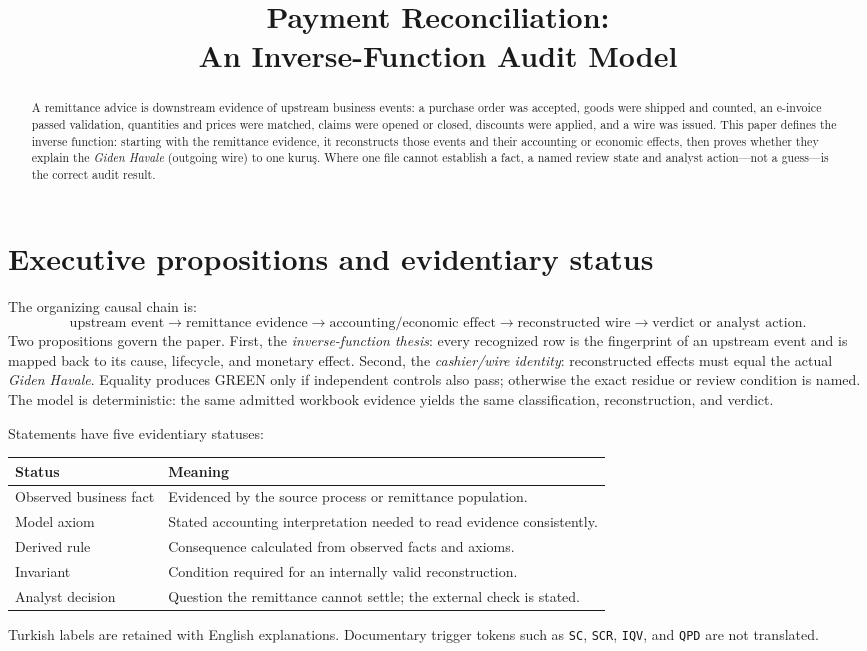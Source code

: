 \documentclass[11pt,a4paper]{article}
\title{Payment Reconciliation:\\An Inverse-Function Audit Model}
\author{}
\date{}
\theoremstyle{definition}
\begin{document}
\maketitle

\begin{abstract}
A remittance advice is downstream evidence of upstream business events:
a purchase order was accepted, goods were shipped and counted, an
e-invoice passed validation, quantities and prices were matched, claims
were opened or closed, discounts were applied, and a wire was issued.
This paper defines the inverse function: starting with the remittance
evidence, it reconstructs those events and their accounting or economic
effects, then proves whether they explain the \emph{Giden Havale}
(outgoing wire) to one kuruş. Where one file cannot establish a fact,
a named review state and analyst action---not a guess---is the correct
audit result.
\end{abstract}

\tableofcontents

\section{Executive propositions and evidentiary status}
The organizing causal chain is:
\[
\text{upstream event}\to\text{remittance evidence}\to
\text{accounting/economic effect}\to\text{reconstructed wire}\to
\text{verdict or analyst action}.
\]
Two propositions govern the paper. First, the \emph{inverse-function
thesis}: every recognized row is the fingerprint of an upstream event
and is mapped back to its cause, lifecycle, and monetary effect. Second,
the \emph{cashier/wire identity}: reconstructed effects must equal the
actual \emph{Giden Havale}. Equality produces GREEN only if independent
controls also pass; otherwise the exact residue or review condition is
named. The model is deterministic: the same admitted workbook evidence
yields the same classification, reconstruction, and verdict.

Statements have five evidentiary statuses:
\begin{center}
\begin{tabularx}{\textwidth}{@{}lX@{}}
\toprule
\textbf{Status} & \textbf{Meaning}\\
\midrule
Observed business fact & Evidenced by the source process or remittance population.\\
Model axiom & Stated accounting interpretation needed to read evidence consistently.\\
Derived rule & Consequence calculated from observed facts and axioms.\\
Invariant & Condition required for an internally valid reconstruction.\\
Analyst decision & Question the remittance cannot settle; the external check is stated.\\
\bottomrule
\end{tabularx}
\end{center}
Turkish labels are retained with English explanations. Documentary
trigger tokens such as \texttt{SC}, \texttt{SCR}, \texttt{IQV}, and
\texttt{QPD} are not translated.
\end{document}
